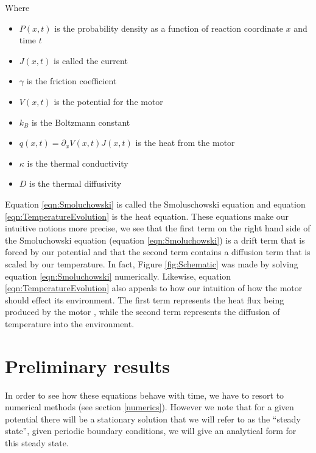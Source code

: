 \documentclass[11pt]{article} %
\begin{document}
Where
\begin{itemize}
\item{$P(x, t)$ is the probability density as a function of  reaction coordinate $x$ and time $t$}
\item{$J(x, t)$ is called the current}
\item{$\gamma$ is the friction coefficient}
\item{$V(x, t)$ is the potential for the motor}
\item{$k_B$ is the Boltzmann constant}
\item{$q(x, t) = \partial_x V(x, t) J(x, t)$ is the heat from the motor}
\item{$\kappa$ is the thermal conductivity}
\item{$D$ is the thermal diffusivity}
\end{itemize}

Equation \ref{eqn:Smoluchowski} is called the Smoluschowski equation \cite{KellerBustamante2000} and equation \ref{eqn:TemperatureEvolution} is the heat equation. These equations make our intuitive notions more precise, we see that the first term on the right hand side of the Smoluchowski equation (equation \ref{eqn:Smoluchowski}) is a drift term that is forced by our potential and that the second term contains a diffusion term that is scaled by our temperature. In fact, Figure \ref{fig:Schematic} was made by solving equation \ref{eqn:Smoluchowski} numerically. Likewise, equation \ref{eqn:TemperatureEvolution} also appeals to how our intuition of how the motor should effect its environment. The first term represents the heat flux being produced by the motor \cite{M.W.Jack2016}, while the second term represents the diffusion of temperature into the environment.


\section{Preliminary results}
 In order to see how these equations behave with time, we have to resort to numerical methods (see section \ref{numerics}). However we note that for a given potential there will be a stationary solution that we will refer to as the ``steady state'', given periodic boundary conditions, we will give an analytical form for this steady state.
\end{document}
